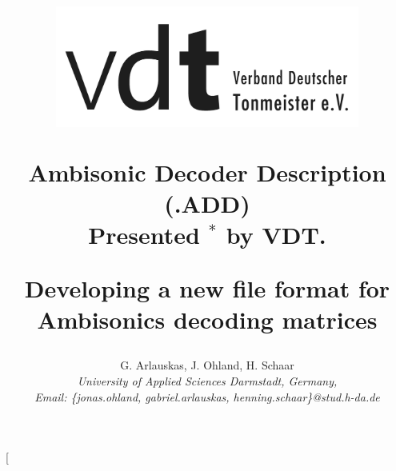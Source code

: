 \documentclass[a4paper, 10pt, twocolumn]{article}
\begin{document}
\fancyhf{} %

\chead{\underline{\sffamily\large\textcolor{gray}{5th International Conference on Spatial Audio ICSA, September 2019}}}
\renewcommand{\headrulewidth}{0pt}
\rhead{}
\renewcommand{\headrulewidth}{0pt}
\rhead{}


\date{}											%

\title{
\vspace{-5mm}%
\mbox{\includegraphics[height=4cm]{VDT}}
%
\vspace{7mm}%
%
\begin{center}
\textbf{\Huge Ambisonic Decoder Description (.ADD)}\\
{ Presented  $^*$ by VDT.}
\end{center}
\vspace{10mm}%
\begin{center}
\textbf\mdseries Developing a new file format for Ambisonics decoding matrices
\end{center}
%
\mbox{}\vspace{-11mm}
%
}

\author{ %
%
G. Arlauskas, J. Ohland, H. Schaar\\
%
\textit{\large %
University of Applied Sciences Darmstadt, Germany,}\\
\textit{\large Email: \{jonas.ohland, gabriel.arlauskas, henning.schaar\}@stud.h-da.de
}\\
%
}
%

\twocolumn[
\maketitle
\thispagestyle{fancy}
%
\end{document}
